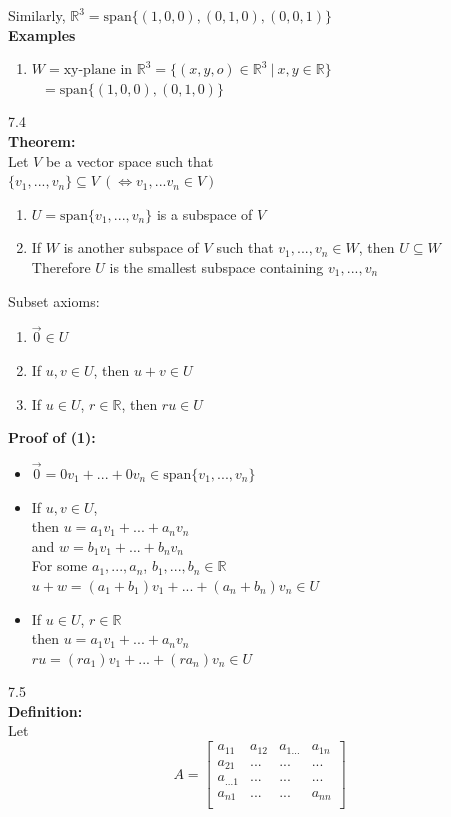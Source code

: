 \documentclass[]{article}
\begin{document}
		Similarly, $\mathbb{R}^3=\text{span}\{ (1,0,0),(0,1,0),(0,0,1) \}$\\
		{\bf Examples}
		\begin{enumerate}
			\item $W=\text{xy-plane in }\mathbb{R}^3=\{ (x,y,o)\in\mathbb{R}^3~|~x,y\in\mathbb{R} \}$\\
			$~~~=\text{span}\{ (1,0,0),(0,1,0) \}$
		\end{enumerate}
		\large{7.4}\\
		\normalsize
		{\bf Theorem:}\\
		Let $V$ be a vector space such that\\
		$\{ v_1,...,v_n \}\subseteq V~(\iff v_1,...v_n\in V)$
		\begin{enumerate}
			\item $U=\text{span}\{ v_1,...,v_n \}$ is a subspace of $V$
			\item If $W$ is another subspace of $V$ such that $v_1,...,v_n\in W$, then $U\subseteq W$\\
			Therefore $U$ is the smallest subspace containing $v_1,...,v_n$
		\end{enumerate}
		Subset axioms:
		\begin{enumerate}
			\item $\vec{0}\in U$
			\item If $u,v\in U$, then $u+v\in U$
			\item If $u\in U$, $r\in\mathbb{R}$, then $ru\in U$
		\end{enumerate}
		\pagebreak
		{\bf Proof of (1):}
		\begin{itemize}
			\item $\vec{0}=0v_1+...+0v_n\in\text{span}\{ v_1,...,v_n \}$
			\item If $u,v\in U$,\\
			then $u=a_1v_1+...+a_nv_n$\\
			and $w=b_1v_1+...+b_nv_n$\\
			For some $a_1,...,a_n$, $b_1,...,b_n\in\mathbb{R}$\\
			$u+w=(a_1+b_1)v_1+...+(a_n+b_n)v_n\in U$
			\item If $u\in U$, $r\in\mathbb{R}$\\
			then $u=a_1v_1+...+a_nv_n$\\
			$ru=(ra_1)v_1+...+(ra_n)v_n\in U$
		\end{itemize}
		\large{7.5}\\
		\normalsize
		{\bf Definition:}\\
		Let
		$$
			A=\begin{bmatrix}
				{a_{11}}&{a_{12}}&{a_{1...}}&{a_{1n}}\\
				{a_{21}}&{...}&{...}&{...}\\
				{a_{...1}}&{...}&{...}&{...}\\
				{a_{n1}}&{...}&{...}&{a_{nn}}\\
			\end{bmatrix}
		$$
\end{document}
